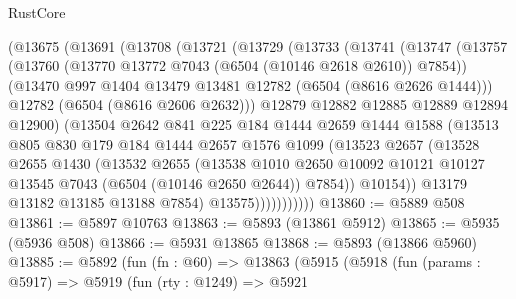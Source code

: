 \begin{lexlean}{RustCore}
\begin{coremodule}
          (@13675
            (@13691
              (@13708
                (@13721
                  (@13729
                    (@13733
                      (@13741
                        (@13747
                          (@13757
                            (@13760 (@13770 @13772 @7043 (@6504 (@10146 @2618 @2610)) @7854))
                            (@13470 @997 @1404 @13479 @13481 @12782 (@6504 (@8616 @2626 @1444)))
                            @12782
                            (@6504 (@8616 @2606 @2632)))
                          @12879
                          @12882
                          @12885
                          @12889
                          @12894
                          @12900)
                        (@13504
                          @2642
                          @841
                          @225
                          @184
                          @1444
                          @2659
                          @1444
                          @1588
                          (@13513
                            @805
                            @830
                            @179
                            @184
                            @1444
                            @2657
                            @1576
                            @1099
                            (@13523
                              @2657
                              (@13528
                                @2655
                                @1430
                                (@13532
                                  @2655
                                  (@13538
                                    @1010
                                    @2650
                                    @10092
                                    @10121
                                    @10127
                                    @13545
                                    @7043
                                    (@6504 (@10146 @2650 @2644))
                                    @7854))
                                @10154))
                            @13179
                            @13182
                            @13185
                            @13188
                            @7854)
                          @13575)))))))))))
@13860 := @5889 @508
@13861 := @5897 @10763
@13863 := @5893 (@13861 @5912)
@13865 := @5935 (@5936 @508)
@13866 := @5931 @13865
@13868 := @5893 (@13866 @5960)
@13885 := @5892
    (fun (fn : @60) =>
    @13863
      (@5915
        (@5918
          (fun (params : @5917) =>
          @5919
            (fun (rty : @1249) =>
            @5921

\end{coremodule}
\end{lexlean}
